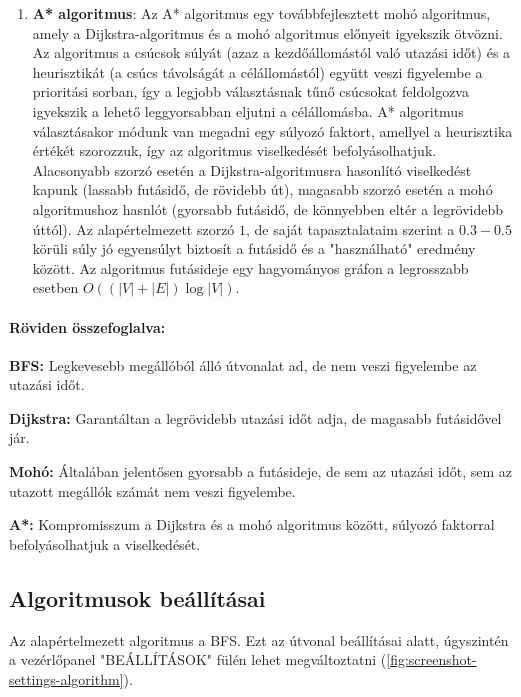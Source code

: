 \begin{enumerate}
	\item \textbf{A* algoritmus}: Az A* algoritmus egy továbbfejlesztett mohó algoritmus, amely a Dijkstra-algoritmus és a mohó algoritmus előnyeit igyekszik ötvözni. Az algoritmus a csúcsok súlyát (azaz a kezdőállomástól való utazási időt) és a heurisztikát (a csúcs távolságát a célállomástól) együtt veszi figyelembe a prioritási sorban, így a legjobb választásnak tűnő csúcsokat feldolgozva igyekszik a lehető leggyorsabban eljutni a célállomásba. A* algoritmus választásakor módunk van megadni egy súlyozó faktort, amellyel a heurisztika értékét szorozzuk, így az algoritmus viselkedését befolyásolhatjuk. Alacsonyabb szorzó esetén a Dijkstra-algoritmusra hasonlító viselkedést kapunk (lassabb futásidő, de rövidebb út), magasabb szorzó esetén a mohó algoritmushoz hasnlót (gyorsabb futásidő, de könnyebben eltér a legrövidebb úttól). Az alapértelmezett szorzó $1$, de saját tapasztalataim szerint a $0.3-0.5$ körüli súly jó egyensúlyt biztosít a futásidő és a "használható" eredmény között. Az algoritmus futásideje egy hagyományos gráfon a legrosszabb esetben $O((|V| + |E|) \log |V|)$.
\end{enumerate}

\paragraph{Röviden összefoglalva:}

\begin{compactitem}
	\item \textbf{BFS:} Legkevesebb megállóból álló útvonalat ad, de nem veszi figyelembe az utazási időt.
	\item \textbf{Dijkstra:} Garantáltan a legrövidebb utazási időt adja, de magasabb futásidővel jár.
	\item \textbf{Mohó:} Általában jelentősen gyorsabb a futásideje, de sem az utazási időt, sem az utazott megállók számát nem veszi figyelembe.
	\item \textbf{A*:} Kompromisszum a Dijkstra és a mohó algoritmus között, súlyozó faktorral befolyásolhatjuk a viselkedését.
\end{compactitem}

\subsection{Algoritmusok beállításai}

Az alapértelmezett algoritmus a BFS. Ezt az útvonal beállításai alatt, úgyszintén a vezérlőpanel "BEÁLLÍTÁSOK" fülén lehet megváltoztatni (\ref{fig:screenshot-settings-algorithm}).

